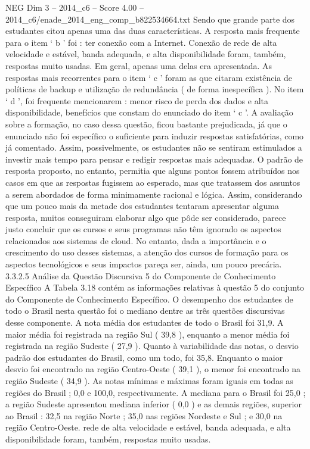 \begin{textsample}{NEG Dim 3 – 2014\_c6 – Score 4.00 – 2014\_c6/enade\_2014\_eng\_comp\_b822534664.txt}
Sendo que grande parte dos estudantes citou apenas uma das duas características.
A resposta mais frequente para o item ‘ b ’ foi : ter conexão com a Internet.
Conexão de rede de alta velocidade e estável, banda adequada, e alta disponibilidade foram, também, respostas muito usadas.
Em geral, apenas uma delas era apresentada.
As respostas mais recorrentes para o item ‘ c ’ foram as que citaram existência de políticas de backup e utilização de redundância ( de forma inespecífica ).
No item ‘ d ’, foi frequente mencionarem : menor risco de perda dos dados e alta disponibilidade, benefícios que constam do enunciado do item ‘ c ’.
A avaliação sobre a formação, no caso dessa questão, ficou bastante prejudicada, já que o enunciado não foi específico o suficiente para induzir respostas satisfatórias, como já comentado.
Assim, possivelmente, os estudantes não se sentiram estimulados a investir mais tempo para pensar e redigir respostas mais adequadas.
O padrão de resposta proposto, no entanto, permitia que alguns pontos fossem atribuídos nos casos em que as respostas fugissem ao esperado, mas que tratassem dos assuntos a serem abordados de forma minimamente racional e lógica.
Assim, considerando que um pouco mais da metade dos estudantes tentaram apresentar alguma resposta, muitos conseguiram elaborar algo que pôde ser considerado, parece justo concluir que os cursos e seus programas não têm ignorado os aspectos relacionados aos sistemas de cloud.
No entanto, dada a importância e o crescimento do uso desses sistemas, a atenção dos cursos de formação para os aspectos tecnológicos e seus impactos pareça ser, ainda, um pouco precária. 3.3.2.5 Análise da Questão Discursiva 5 do Componente de Conhecimento Específico A Tabela 3.18 contém as informações relativas à questão 5 do conjunto do Componente de Conhecimento Específico.
O desempenho dos estudantes de todo o Brasil nesta questão foi o mediano dentre as três questões discursivas desse componente.
A nota média dos estudantes de todo o Brasil foi 31,9.
A maior média foi registrada na região Sul ( 39,8 ), enquanto a menor média foi registrada na região Sudeste ( 27,9 ).
Quanto à variabilidade das notas, o desvio padrão dos estudantes do Brasil, como um todo, foi 35,8.
Enquanto o maior desvio foi encontrado na região Centro-Oeste ( 39,1 ), o menor foi encontrado na região Sudeste ( 34,9 ).
As notas mínimas e máximas foram iguais em todas as regiões do Brasil ; 0,0 e 100,0, respectivamente.
A mediana para o Brasil foi 25,0 ; a região Sudeste apresentou mediana inferior ( 0,0 ) e as demais regiões, superior ao Brasil : 32,5 na região Norte ; 35,0 nas regiões Nordeste e Sul ; e 30,0 na região Centro-Oeste. rede de alta velocidade e estável, banda adequada, e alta disponibilidade foram, também, respostas muito usadas.

\end{textsample}
